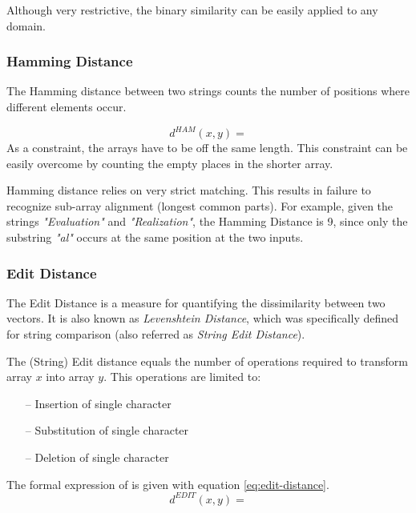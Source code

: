 Although very restrictive, the binary similarity can be easily applied to any domain. 

\subsubsection{Hamming Distance}
The Hamming distance between two strings counts the number of positions where different elements occur. 

\begin{equation}
	d^{HAM}(x,y) = 
\end{equation}
As a constraint, the arrays have to be off the same length. 
This constraint can be easily overcome by counting the empty places in the shorter array. 

Hamming distance relies on very strict matching. This results in failure to recognize sub-array alignment (longest common parts). 
For example, given the strings \emph{"Evaluation"} and \emph{"Realization"}, 
the Hamming Distance is 9, 
since only the substring \emph{"al"} occurs at the same position at the two inputs.

\subsubsection{Edit Distance}
The Edit Distance  is a measure for quantifying the dissimilarity between two vectors\cite{Jurafsky:2009:SLP:1214993}.
It is also known as \emph{Levenshtein Distance}, which was specifically defined for string comparison 
(also referred as \emph{String Edit Distance})\cite{Navarro:2001:GTA:375360.375365}.

The (String) Edit distance equals the number of operations required to transform array $x$ into array $y$. 
This operations are limited to:
\begin{itemize}
	\item[--] Insertion of single character
	\item[--] Substitution of single character
	\item[--] Deletion of single character
\end{itemize}

The formal expression of is given with equation \ref{eq:edit-distance}.
\begin{equation}
	d^{EDIT}(x,y) = 
	\label{eq:edit-distance}
\end{equation}

